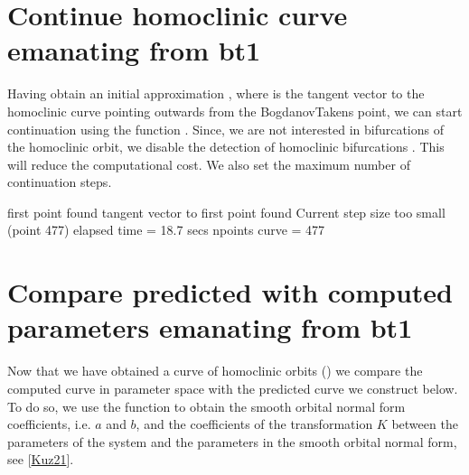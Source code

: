 \documentclass[letterpaper,10pt,english]{jupyterBook}
\begin{document}
\noindent{}


\section{Continue homoclinic curve emanating from bt1}
\label{\detokenize{Morris-Lecar:continue-homoclinic-curve-emanating-from-bt1}}
\sphinxAtStartPar
Having obtain an initial approximation , where  is the
tangent vector to the homoclinic curve pointing outwards from the
Bogdanov\sphinxhyphen{}Takens point, we can start continuation using the function .
Since, we are not interested in bifurcations of the homoclinic
orbit, we disable the detection of homoclinic bifurcations . This will reduce the computational cost. We also set the maximum number of
continuation steps.

\begin{sphinxVerbatim}[commandchars=\\\{\}]
\end{sphinxVerbatim}

\begin{sphinxVerbatim}[commandchars=\\\{\}]
first point found
tangent vector to first point found
Current step size too small (point 477)
elapsed time  = 18.7 secs
npoints curve = 477
\end{sphinxVerbatim}


\section{Compare predicted with computed parameters emanating from bt1}
\label{\detokenize{Morris-Lecar:compare-predicted-with-computed-parameters-emanating-from-bt1}}
\sphinxAtStartPar
Now that we have obtained a curve of homoclinic orbits () we
compare the computed curve in parameter space with the predicted curve we
construct below. To do so, we use the function  to obtain the
smooth orbital normal form coefficients, i.e. \(a\) and \(b\), and the coefficients
of the transformation \(K\) between the parameters of the system and the parameters
in the smooth orbital normal form, see {[}\hyperlink{cite.references:id3}{Kuz21}{]}.
\end{document}
